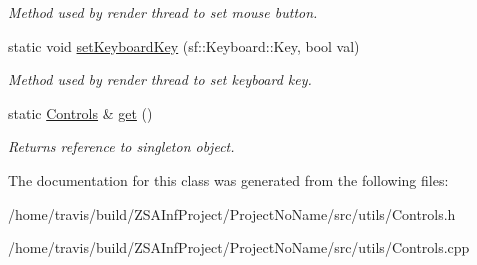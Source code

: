 \begin{DoxyCompactItemize}
\begin{DoxyCompactList}\small\item\em Method used by render thread to set mouse button. \end{DoxyCompactList}\item 
\hypertarget{classControls_a47b500a4326b1876afa64989cedcc2a7}{static void \hyperlink{classControls_a47b500a4326b1876afa64989cedcc2a7}{set\-Keyboard\-Key} (sf\-::\-Keyboard\-::\-Key, bool val)}\label{classControls_a47b500a4326b1876afa64989cedcc2a7}

\begin{DoxyCompactList}\small\item\em Method used by render thread to set keyboard key. \end{DoxyCompactList}\item 
\hypertarget{classControls_ac5617a8cccbde9b6372919318b704a0d}{static \hyperlink{classControls}{Controls} \& \hyperlink{classControls_ac5617a8cccbde9b6372919318b704a0d}{get} ()}\label{classControls_ac5617a8cccbde9b6372919318b704a0d}

\begin{DoxyCompactList}\small\item\em Returns reference to singleton object. \end{DoxyCompactList}\end{DoxyCompactItemize}


The documentation for this class was generated from the following files\-:\begin{DoxyCompactItemize}
\item 
/home/travis/build/\-Z\-S\-A\-Inf\-Project/\-Project\-No\-Name/src/utils/Controls.\-h\item 
/home/travis/build/\-Z\-S\-A\-Inf\-Project/\-Project\-No\-Name/src/utils/Controls.\-cpp\end{DoxyCompactItemize}
